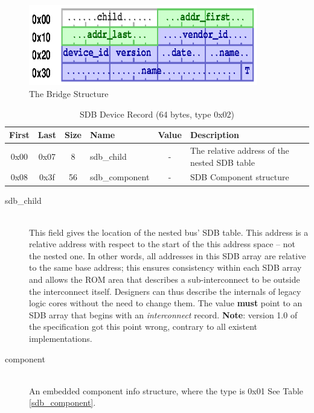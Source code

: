 \documentclass[a4paper, 12pt]{article}
\begin{document}
\begin{figure}[h]
\centering%
\includegraphics[width=100mm]{img/sdb-bridge.ps}
\caption{The Bridge Structure}
\label{fig:FigureBridge}
\end{figure}

\begin{center}
  \begin{savenotes}
    \begin{table}[!ht]\footnotesize
      \caption{SDB Device Record (64 bytes, type 0x02)}\label{sdb_bridge}\centering
        \begin{tabular}{| c | c | c | l | c | p{5cm} |} \hline
        First & Last & Size & Name & Value & Description \\ \hline
        0x00 & 0x07 & 8 & sdb\_child & - & The relative address of the nested SDB table \\ \hline
        0x08 & 0x3f & 56 & sdb\_component & - & SDB Component structure \\ \hline
        \end{tabular}
    \end{table}
  \end{savenotes}
\end{center}

\begin{description}
\item[sdb\_child] \hfill \\
This field gives the location of the nested bus' SDB table. This address is a relative address
with respect to the start of the this address space -- not the nested one. In other words,
all addresses in this SDB array are relative to the same base address; this ensures consistency
within each SDB array and allows the ROM area that describes a sub-interconnect to be
outside the interconnect itself.  Designers can thus describe the internals of legacy logic
cores without the need to change them.
The value \textbf{must} point to an SDB array that begins with an \textit{interconnect} record.
\textbf{Note}: version 1.0 of the specification
got this point wrong, contrary to all existent implementations.

\item[component] \hfill \\
An embedded component info structure, where the type is 0x01 See Table \ref{sdb_component}.
\end{description}
\end{document}
